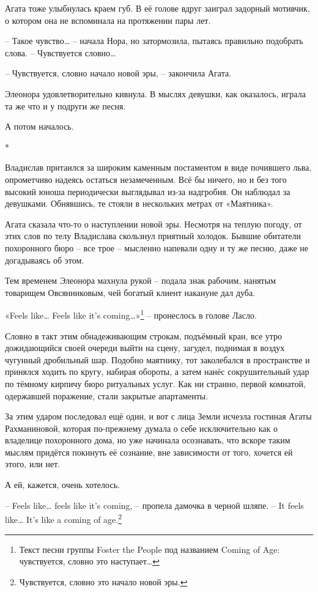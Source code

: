 \documentclass[
  a5paperpaper,
  DIV=11,
  numbers=noendperiod]{scrreprt}
\begin{document}
Агата тоже улыбнулась краем губ. В её голове вдруг заиграл задорный
мотивчик, о котором она не вспоминала на протяжении пары лет.

-- Такое чувство\ldots{} -- начала Нора, но затормозила, пытаясь
правильно подобрать слова. -- Чувствуется словно\ldots{}

-- Чувствуется, словно начало новой эры, -- закончила Агата.

Элеонора удовлетворительно кивнула. В мыслях девушки, как оказалось,
играла та же что и у подруги же песня.

А потом началось.

*

Владислав притаился за широким каменным постаментом в виде почившего
льва, опрометчиво надеясь остаться незамеченным. Всё бы ничего, но и без
того высокий юноша периодически выглядывал из-за надгробия. Он наблюдал
за девушками. Обнявшись, те стояли в нескольких метрах от «Маятника».

Агата сказала что-то о наступлении новой эры. Несмотря на теплую погоду,
от этих слов по телу Владислава скользнул приятный холодок. Бывшие
обитатели похоронного бюро -- все трое -- мысленно напевали одну и ту же
песню, даже не догадываясь об этом.

Тем временем Элеонора махнула рукой -- подала знак рабочим, нанятым
товарищем Овсянниковым, чей богатый клиент накануне дал дуба.

«Feels like\ldots{} Feels like it's coming\ldots»\footnote{Текст песни
  группы Foster the People под названием Coming of Age: чувствуется,
  словно это наступает\ldots{}} -- пронеслось в голове Ласло.

Словно в такт этим обнадеживающим строкам, подъёмный кран, все утро
дожидающийся своей очереди выйти на сцену, загудел, поднимая в воздух
чугунный дробильный шар. Подобно маятнику, тот заколебался в
пространстве и принялся ходить по кругу, набирая обороты, а затем нанёс
сокрушительный удар по тёмному кирпичу бюро ритуальных услуг. Как ни
странно, первой комнатой, одержавшей поражение, стали закрытые
апартаменты.

За этим ударом последовал ещё один, и вот с лица Земли исчезла гостиная
Агаты Рахманиновой, которая по-прежнему думала о себе исключительно как
о владелице похоронного дома, но уже начинала осознавать, что вскоре
таким мыслям придётся покинуть её сознание, вне зависимости от того,
хочется ей этого, или нет.

А ей, кажется, очень хотелось.

-- Feels like\ldots{} feels like it's coming, -- пропела дамочка в
черной шляпе. -- It feels like\ldots{} It's like a coming of
age.\footnote{Чувствуется, словно это начало новой эры.}
\end{document}
